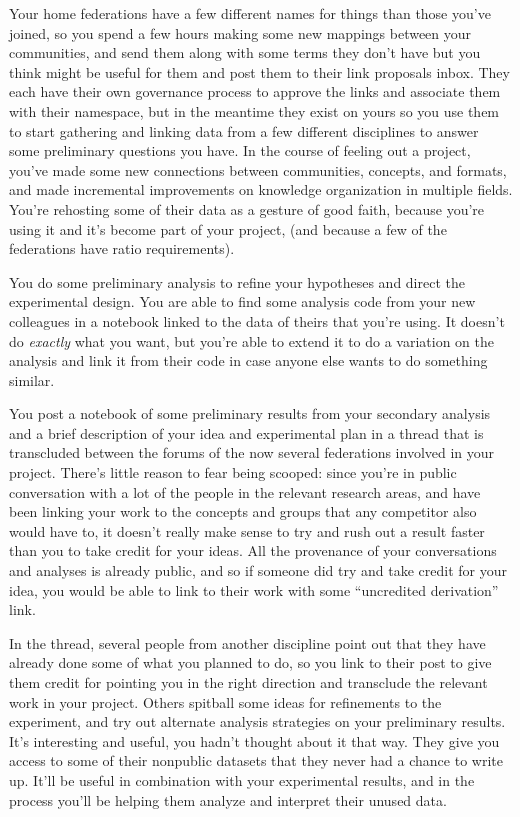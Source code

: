 Your home federations have a few different names for things than those
you've joined, so you spend a few hours making some new mappings between
your communities, and send them along with some terms they don't have
but you think might be useful for them and post them to their link
proposals inbox. They each have their own governance process to approve
the links and associate them with their namespace, but in the meantime
they exist on yours so you use them to start gathering and linking data
from a few different disciplines to answer some preliminary questions
you have. In the course of feeling out a project, you've made some new
connections between communities, concepts, and formats, and made
incremental improvements on knowledge organization in multiple fields.
You're rehosting some of their data as a gesture of good faith, because
you're using it and it's become part of your project, (and because a few
of the federations have ratio requirements).

You do some preliminary analysis to refine your hypotheses and direct
the experimental design. You are able to find some analysis code from
your new colleagues in a notebook linked to the data of theirs that
you're using. It doesn't do \emph{exactly} what you want, but you're
able to extend it to do a variation on the analysis and link it from
their code in case anyone else wants to do something similar.

You post a notebook of some preliminary results from your secondary
analysis and a brief description of your idea and experimental plan in a
thread that is transcluded between the forums of the now several
federations involved in your project. There's little reason to fear
being scooped: since you're in public conversation with a lot of the
people in the relevant research areas, and have been linking your work
to the concepts and groups that any competitor also would have to, it
doesn't really make sense to try and rush out a result faster than you
to take credit for your ideas. All the provenance of your conversations
and analyses is already public, and so if someone did try and take
credit for your idea, you would be able to link to their work with some
``uncredited derivation'' link.

In the thread, several people from another discipline point out that
they have already done some of what you planned to do, so you link to
their post to give them credit for pointing you in the right direction
and transclude the relevant work in your project. Others spitball some
ideas for refinements to the experiment, and try out alternate analysis
strategies on your preliminary results. It's interesting and useful, you
hadn't thought about it that way. They give you access to some of their
nonpublic datasets that they never had a chance to write up. It'll be
useful in combination with your experimental results, and in the process
you'll be helping them analyze and interpret their unused data.

